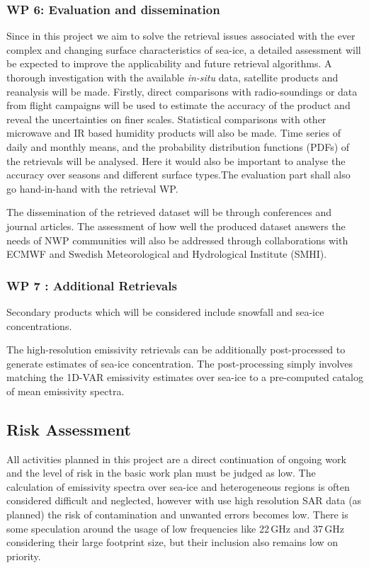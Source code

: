 \documentclass[12pt,oneside,a4paper]{article}
\begin{document}
\subsubsection*{WP 6: Evaluation and dissemination}
%
\label{sec:evaluation}
Since in this project we aim to solve the retrieval issues associated with the ever complex and changing surface characteristics of sea-ice, a detailed assessment will be expected to improve the applicability and future retrieval algorithms. A thorough investigation with the available \textit{in-situ} data, satellite products and reanalysis will be made. Firstly, direct comparisons with radio-soundings or data from flight campaigns will be used to estimate the accuracy of the product and reveal the uncertainties on finer scales. Statistical comparisons with other microwave and IR based humidity products  will also be made. Time series of daily and monthly means, and the probability distribution functions (PDFs) of the retrievals will be analysed. Here it would also be important to analyse the accuracy over seasons and different surface types.The evaluation part shall also go hand-in-hand with the retrieval WP.

The dissemination of the retrieved dataset will be through conferences and journal articles. The assessment of how well the produced dataset answers the needs of NWP communities will also be addressed through collaborations with ECMWF and Swedish Meteorological and Hydrological Institute (SMHI). 

\subsubsection*{WP 7 : Additional Retrievals}
%
\label{sec:other_retrievals}

Secondary products which will be considered include snowfall and sea-ice concentrations.  


The high-resolution emissivity retrievals can be additionally post-processed to generate estimates of sea-ice concentration. The post-processing simply involves matching the 1D-VAR emissivity estimates over sea-ice to a pre-computed catalog of mean emissivity spectra. %

 
\subsection{Risk Assessment}
%
\label{sec:risk}
All activities planned in this project are a direct continuation of ongoing work and the level of risk in the basic work plan must be judged as low. The calculation of emissivity spectra over sea-ice and heterogeneous regions is often considered difficult and neglected, however with use high resolution SAR data (as planned) the risk of contamination and unwanted errors becomes low. There is some speculation around the usage of low frequencies like 22\,GHz and 37\,GHz considering their large footprint size, but their inclusion also remains low on priority. 
\end{document}
